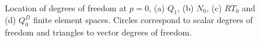 \documentclass[review,times]{elsarticle}
\begin{document}
\begin{figure}
\vspace{-2cm}
\centering
\vspace{-1cm}
%
\\
%
%
\caption{\label{fig:fem-spaces} Location of degrees of freedom at
  $p=0$, (a) $Q_{1}$, (b) $N_0$, (c) $RT_0$ and (d) $Q_0^D$ finite element spaces.
Circles correspond to scalar degrees of freedom and triangles to vector degrees
of freedom.}
\end{figure}
\end{document}
